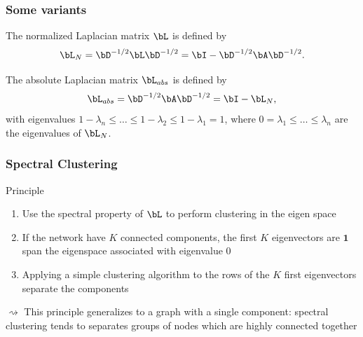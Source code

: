 \begin{frame}
  \frametitle{Some variants}

  \begin{definition}
    The normalized Laplacian matrix $\bL$ is defined by 
    \[
      \bL_N = \bD^{-1/2}\bL\bD^{-1/2} = \bI - \bD^{-1/2} \bA \bD^{-1/2}.
    \]
  \end{definition}
  
  \vfill

  \begin{definition}
    The absolute Laplacian matrix $\bL_{abs}$ is defined by 
    \[
      \bL_{abs} = \bD^{-1/2}\bA\bD^{-1/2} = \bI - \bL_N,
    \]
    with eigenvalues $1-\lambda_n \leq \dots \leq 1-\lambda_2 \leq 1-\lambda_1 = 1$, where $0=\lambda_1\leq \dots \leq \lambda_n$ are the eigenvalues of $\bL_N$.
  \end{definition}

\end{frame}

\begin{frame}
  \frametitle{Spectral Clustering}
    
  \begin{block}{Principle}
  
  \begin{enumerate}
    \item Use the spectral property of $\bL$ to perform clustering in the eigen space \medskip
    \item If the network have $K$ connected components, the first $K$ eigenvectors are $\mathbf{1}$ span the eigenspace associated with eigenvalue $0$ \medskip
    \item Applying a simple clustering algorithm to the rows of the $K$ first eigenvectors separate the components
  \end{enumerate}
  $\rightsquigarrow$ This principle generalizes to a graph with a single component: spectral clustering tends to separates groups of nodes which are highly connected together
  
  \end{block}
  
\end{frame}

